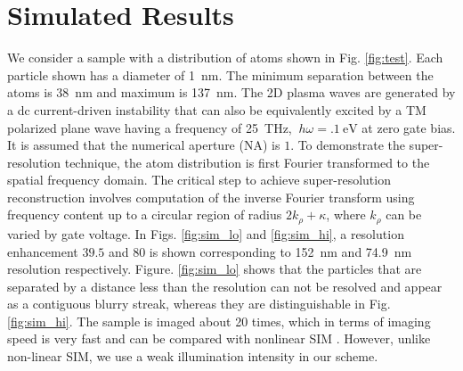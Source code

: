 \documentclass[10pt]{article}
\renewcommand{\^}{\hat}  %
\renewcommand{\O}{\omega}  %
\newcommand{\p}{\rho}  %
\renewcommand{\^}{\hat}  %
\begin{document}
\section{Simulated Results}
%
We consider a sample with a distribution of atoms shown in Fig. \ref{fig:test}. Each particle shown has a diameter of \SI{1}{\nm}. The minimum separation between the atoms is \SI{38}{\nm} and maximum is \SI{137}{\nm}. The 2D plasma waves are generated by a dc current-driven instability that can also be equivalently  excited by a TM polarized plane wave having a frequency of \SI{25}{\THz}, $~h\O = \SI{.1}{\electronvolt}$ at zero gate bias. It is assumed that the numerical aperture (NA) is $1$. To demonstrate the super-resolution technique, the atom distribution is first Fourier transformed to the spatial frequency domain. The critical step to achieve super-resolution reconstruction involves computation of the inverse Fourier transform using frequency content up to a circular region of radius $2k_{\p} + \kappa$, where $k_{\p}$ can be varied by gate voltage. In Figs. \ref{fig:sim_lo} and \ref{fig:sim_hi}, a resolution enhancement $39.5$ and $80$ is shown corresponding to \SI{152}{\nm} and \SI{74.9}{\nm} resolution respectively.
Figure. \ref{fig:sim_lo} shows that the particles that are separated by a distance less than the resolution can not be resolved and appear as a contiguous blurry streak, whereas they are distinguishable in Fig. \ref{fig:sim_hi}. The sample is imaged about 20 times, which in terms of imaging speed is very fast and can be compared with nonlinear SIM \cite{Gustafsson_2005}. However, unlike non-linear SIM, we use a weak illumination intensity in our scheme.
\end{document}
